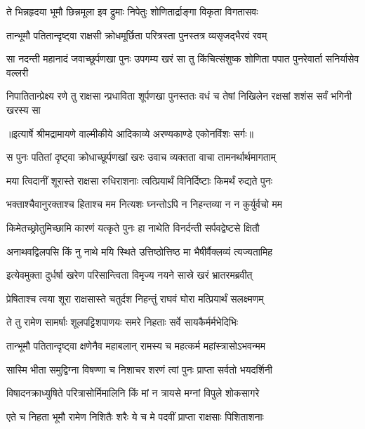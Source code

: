 \twolineshloka
{ते भिन्नहृदया भूमौ छिन्नमूला इव द्रुमाः}
{निपेतुः शोणितार्द्राङ्गा विकृता विगतासवः} %

\twolineshloka
{तान्भूमौ पतितान्दृष्ट्वा राक्षसी क्रोधमूर्छिता}
{परित्रस्ता पुनस्तत्र व्यसृजद्भैरवं रवम्} %

\threelineshloka
{सा नदन्ती महानादं जवाच्छूर्पणखा पुनः}
{उपगम्य खरं सा तु किंचित्संशुष्क शोणिता}
{पपात पुनरेवार्ता सनिर्यासेव वल्लरी} %

\fourlineindentedshloka
{निपातितान्प्रेक्ष्य रणे तु राक्षसा}
{न्प्रधाविता शूर्पणखा पुनस्ततः}
{वधं च तेषां निखिलेन रक्षसां}
{ शशंस सर्वं भगिनी खरस्य सा} %


{॥इत्यार्षे श्रीमद्रामायणे वाल्मीकीये आदिकाव्ये अरण्यकाण्डे एकोनविंशः सर्गः॥}


\twolineshloka
{स पुनः पतितां दृष्ट्वा क्रोधाच्छूर्पणखां खरः}
{उवाच व्यक्तता वाचा तामनर्थार्थमागताम्} %

\twolineshloka
{मया त्विदानीं शूरास्ते राक्षसा रुधिराशनाः}
{त्वत्प्रियार्थं विनिर्दिष्टाः किमर्थं रुद्यते पुनः} %

\twolineshloka
{भक्ताश्चैवानुरक्ताश्च हिताश्च मम नित्यशः}
{घ्नन्तोऽपि न निहन्तव्या न न कुर्युर्वचो मम} %

\twolineshloka
{किमेतच्छ्रोतुमिच्छामि कारणं यत्कृते पुनः}
{हा नाथेति विनर्दन्ती सर्पवद्वेष्टसे क्षितौ} %

\twolineshloka
{अनाथवद्विलपसि किं नु नाथे मयि स्थिते}
{उत्तिष्ठोत्तिष्ठ मा भैषीर्वैक्लव्यं त्यज्यतामिह} %

\twolineshloka
{इत्येवमुक्ता दुर्धर्षा खरेण परिसान्त्विता}
{विमृज्य नयने सास्रे खरं भ्रातरमब्रवीत्} %

\twolineshloka
{प्रेषिताश्च त्वया शूरा राक्षसास्ते चतुर्दश}
{निहन्तुं राघवं घोरा मत्प्रियार्थं सलक्ष्मणम्} %

\twolineshloka
{ते तु रामेण सामर्षाः शूलपट्टिशपाणयः}
{समरे निहताः सर्वे सायकैर्मर्मभेदिभिः} %

\twolineshloka
{तान्भूमौ पतितान्दृष्ट्वा क्षणेनैव महाबलान्}
{रामस्य च महत्कर्म महांस्त्रासोऽभवन्मम} %

\twolineshloka
{सास्मि भीता समुद्विग्ना विषण्णा च निशाचर}
{शरणं त्वां पुनः प्राप्ता सर्वतो भयदर्शिनी} %

\twolineshloka
{विषादनक्राध्युषिते परित्रासोर्मिमालिनि}
{किं मां न त्रायसे मग्नां विपुले शोकसागरे} %

\twolineshloka
{एते च निहता भूमौ रामेण निशितैः शरैः}
{ये च मे पदवीं प्राप्ता राक्षसाः पिशिताशनाः} %

